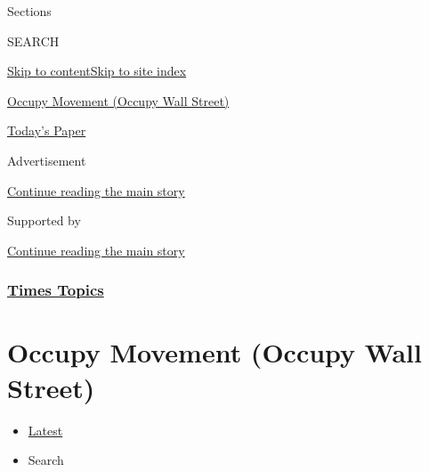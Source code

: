 Sections

SEARCH

\protect\hyperlink{site-content}{Skip to
content}\protect\hyperlink{site-index}{Skip to site index}

\href{https://www.nytimes.com/topic/organization/occupy-movement-occupy-wall-street}{Occupy
Movement (Occupy Wall Street)}

\href{https://myaccount.nytimes.com/auth/login?response_type=cookie\&client_id=vi}{}

\href{https://www.nytimes.com/section/todayspaper}{Today's Paper}

Advertisement

\protect\hyperlink{after-top}{Continue reading the main story}

Supported by

\protect\hyperlink{after-sponsor}{Continue reading the main story}

\hypertarget{times-topics}{%
\subsubsection{\texorpdfstring{\href{/index.html}{Times
Topics}}{Times Topics}}\label{times-topics}}

\hypertarget{occupy-movement-occupy-wall-street}{%
\section{Occupy Movement (Occupy Wall
Street)}\label{occupy-movement-occupy-wall-street}}

\begin{itemize}
\tightlist
\item
  \protect\hyperlink{stream-panel}{Latest}
\item
  Search
\end{itemize}

